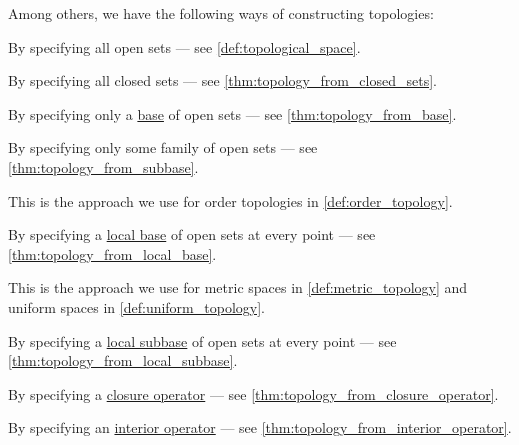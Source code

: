 \begin{remark}\label{rem:constructing_topologies}
  Among others, we have the following ways of constructing topologies:
  \begin{thmenum}
     By specifying all open sets --- see \cref{def:topological_space}.

     By specifying all closed sets --- see \cref{thm:topology_from_closed_sets}.

     By specifying only a \hyperref[def:topological_base]{base} of open sets --- see \cref{thm:topology_from_base}.

     By specifying only some family of open sets --- see \cref{thm:topology_from_subbase}.

    This is the approach we use for order topologies in \cref{def:order_topology}.

     By specifying a \hyperref[def:topological_local_base]{local base} of open sets at every point --- see \cref{thm:topology_from_local_base}.

    This is the approach we use for metric spaces in \cref{def:metric_topology} and uniform spaces in \cref{def:uniform_topology}.

     By specifying a \hyperref[def:topological_local_subbase]{local subbase} of open sets at every point --- see \cref{thm:topology_from_local_subbase}.

     By specifying a \hyperref[def:topological_closure_operator]{closure operator} --- see \cref{thm:topology_from_closure_operator}.

     By specifying an \hyperref[def:topological_interior_operator]{interior operator} --- see \cref{thm:topology_from_interior_operator}.
  \end{thmenum}
\end{remark}

